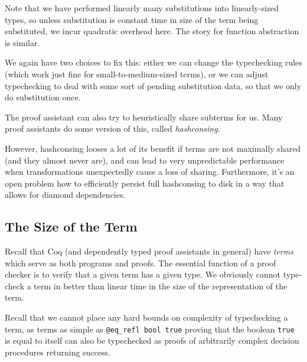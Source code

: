 Note that we have performed linearly many substitutions into linearly-sized types, so unless substitution is constant time in size of the term being substituted, we incur quadratic overhead here.
The story for function abstraction is similar.


We again have two choices to fix this:
either we can change the typechecking rules (which work just fine for small-to-medium-sized terms), or we can adjust typechecking to deal with some sort of pending substitution data, so that we only do substitution once.




The proof assistant can also try to heuristically share subterms for us.
Many proof assistants do some version of this, called \emph{hashconsing}.

However, hashconsing looses a lot of its benefit if terms are not maximally shared (and they almost never are), and can lead to very unpredictable performance when transformations unexpectedly cause a loss of sharing.
Furthermore, it's an open problem how to efficiently persist full hashconsing to disk in a way that allows for diamond dependencies.

\subsection{The Size of the Term}

Recall that Coq (and dependently typed proof assistants in general) have \emph{terms} which serve as both programs and proofs.
The essential function of a proof checker is to verify that a given term has a given type.
We obviously cannot type-check a term in better than linear time in the size of the representation of the term.

Recall that we cannot place any hard bounds on complexity of typechecking a term, as terms as simple as \texttt{@eq_refl bool true} proving that the boolean \texttt{true} is equal to itself can also be typechecked as proofs of arbitrarily complex decision procedures returning success.

